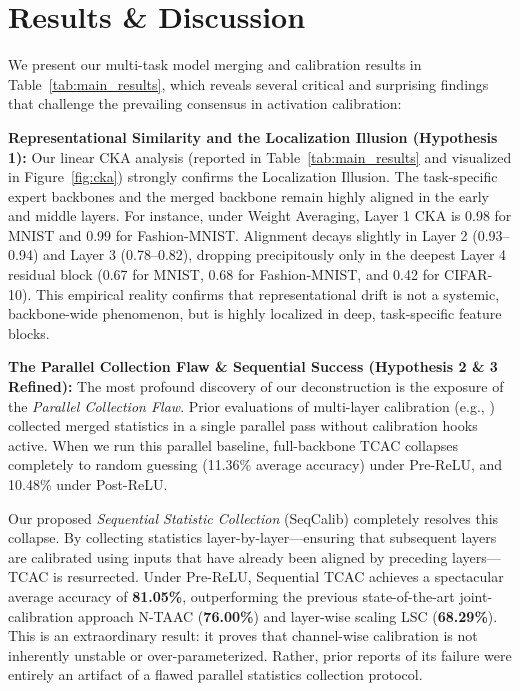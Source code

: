 \documentclass{article}
\theoremstyle{plain}
\theoremstyle{definition}
\theoremstyle{remark}
\begin{document}
\section{Results \& Discussion}
\label{sec:results}

We present our multi-task model merging and calibration results in Table~\ref{tab:main_results}, which reveals several critical and surprising findings that challenge the prevailing consensus in activation calibration:

\textbf{Representational Similarity and the Localization Illusion (Hypothesis 1):}
Our linear CKA analysis (reported in Table~\ref{tab:main_results} and visualized in Figure~\ref{fig:cka}) strongly confirms the Localization Illusion. The task-specific expert backbones and the merged backbone remain highly aligned in the early and middle layers. For instance, under Weight Averaging, Layer 1 CKA is 0.98 for MNIST and 0.99 for Fashion-MNIST. Alignment decays slightly in Layer 2 (0.93--0.94) and Layer 3 (0.78--0.82), dropping precipitously only in the deepest Layer 4 residual block (0.67 for MNIST, 0.68 for Fashion-MNIST, and 0.42 for CIFAR-10). This empirical reality confirms that representational drift is not a systemic, backbone-wide phenomenon, but is highly localized in deep, task-specific feature blocks. 

\textbf{The Parallel Collection Flaw \& Sequential Success (Hypothesis 2 \& 3 Refined):}
The most profound discovery of our deconstruction is the exposure of the \textit{Parallel Collection Flaw}. Prior evaluations of multi-layer calibration (e.g., \cite{lsc2026}) collected merged statistics in a single parallel pass without calibration hooks active. When we run this parallel baseline, full-backbone TCAC collapses completely to random guessing (11.36\% average accuracy) under Pre-ReLU, and 10.48\% under Post-ReLU. 

Our proposed \textit{Sequential Statistic Collection} (SeqCalib) completely resolves this collapse. By collecting statistics layer-by-layer—ensuring that subsequent layers are calibrated using inputs that have already been aligned by preceding layers—TCAC is resurrected. Under Pre-ReLU, Sequential TCAC achieves a spectacular average accuracy of \textbf{81.05\%}, outperforming the previous state-of-the-art joint-calibration approach N-TAAC (\textbf{76.00\%}) and layer-wise scaling LSC (\textbf{68.29\%}). This is an extraordinary result: it proves that channel-wise calibration is not inherently unstable or over-parameterized. Rather, prior reports of its failure were entirely an artifact of a flawed parallel statistics collection protocol.
\end{document}
